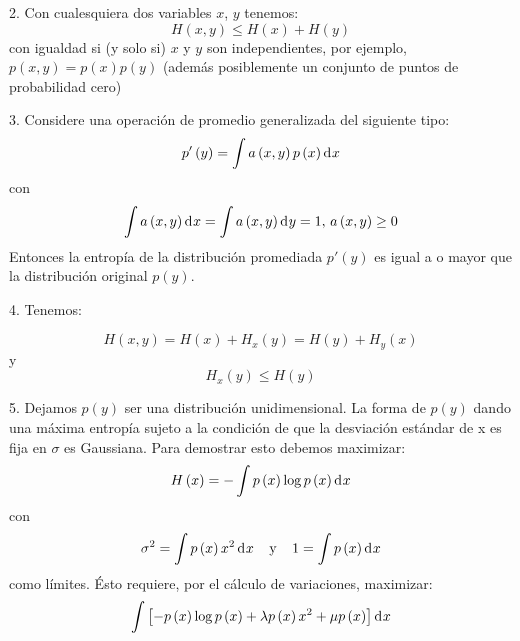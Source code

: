 2. Con cualesquiera dos variables $x$, $y$ tenemos:
\begin{equation}
H\left ( x,y \right )\leq H\left ( x \right )+H\left ( y \right )
\end{equation}
con igualdad si (y solo si) $x$ y $y$ son independientes, por ejemplo,
$p\left ( x,y \right )=p\left ( x \right )p\left ( y \right )$
(adem\'{a}s posiblemente un conjunto de puntos de probabilidad cero)

3. Considere una operaci\'{o}n de promedio generalizada del siguiente tipo:
\begin{equation}
{p}'\left ( y \right )=\int a\left ( x,y \right )p\left ( x \right ) \diff x 
\end{equation}
con
\begin{equation}
\int a\left ( x,y \right ) \diff x =\int a\left ( x,y \right ) \diff y =1, 
\,  a\left ( x,y \right )\geq 0
\end{equation}
Entonces la entrop\'ia de la distribuci\'{o}n promediada ${p}'\left ( y
\right )$ es igual a o mayor que la distribuci\'{o}n original $p\left
( y \right )$. 

4. Tenemos:

\begin{equation}
H\left ( x,y \right )=H\left ( x \right )+H_{x}\left ( y \right )=H\left ( y \right )+H_{y}\left ( x \right )
\end{equation}
y
\begin{equation}
H_x{}\left ( y \right )\leq H\left ( y \right )
\end{equation}

5. Dejamos $p\left ( y \right )$ ser una distribuci\'{o}n unidimensional. La forma de $p\left ( y \right )$ dando una m\'{a}xima entrop\'ia sujeto a la condici\'{o}n de que la desviaci\'{o}n est\'{a}ndar de x es fija en $\sigma $ es Gaussiana. Para demostrar esto debemos maximizar:
\begin{equation}
H\left ( x \right )=-\int p\left ( x \right )\log p\left ( x \right ) \diff x 
\end{equation}
con
\begin{equation}
\sigma^{2}=\int p\left ( x \right )x^{2} \diff x  \:\:\:\:\: \textup{y} \:\:\:\:\: 1=\int p\left ( x \right ) \diff x 
\end{equation}
como l\'{i}mites. \'{E}sto requiere, por el c\'{a}lculo de variaciones, maximizar:
\begin{equation}
\int \left [ -p\left ( x \right ) \log p\left ( x \right ) + \lambda p\left ( x \right ) x^{2} + \mu p\left ( x \right )\right ] \diff x 
\end{equation}

